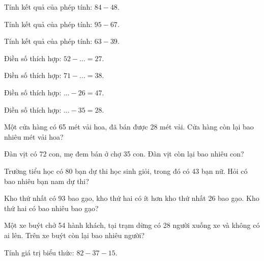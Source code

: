 \begin{ex}
Tính kết quả của phép tính: $84 - 48$.
\end{ex}

\begin{ex}
Tính kết quả của phép tính: $95 - 67$.
\end{ex}

\begin{ex}
Tính kết quả của phép tính: $63 - 39$.
\end{ex}

\begin{ex}
Điền số thích hợp: $52 - \dots = 27$.
\end{ex}

\begin{ex}
Điền số thích hợp: $71 - \dots = 38$.
\end{ex}

\begin{ex}
Điền số thích hợp: $\dots - 26 = 47$.
\end{ex}

\begin{ex}
Điền số thích hợp: $\dots - 35 = 28$.
\end{ex}

\begin{ex}
Một cửa hàng có 65 mét vải hoa, đã bán được 28 mét vải. Cửa hàng còn lại bao nhiêu mét vải hoa?
\end{ex}

\begin{ex}
Đàn vịt có 72 con, mẹ đem bán ở chợ 35 con. Đàn vịt còn lại bao nhiêu con?
\end{ex}

\begin{ex}
Trường tiểu học có 80 bạn dự thi học sinh giỏi, trong đó có 43 bạn nữ. Hỏi có bao nhiêu bạn nam dự thi?
\end{ex}

\begin{ex}
Kho thứ nhất có 93 bao gạo, kho thứ hai có ít hơn kho thứ nhất 26 bao gạo. Kho thứ hai có bao nhiêu bao gạo?
\end{ex}

\begin{ex}
Một xe buýt chở 54 hành khách, tại trạm dừng có 28 người xuống xe và không có ai lên. Trên xe buýt còn lại bao nhiêu người?
\end{ex}

\begin{ex}
Tính giá trị biểu thức: $82 - 37 - 15$.
\end{ex}
